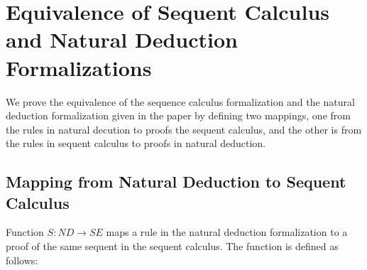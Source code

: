 
\section{Equivalence of Sequent Calculus and Natural Deduction Formalizations}
\label{app:seq-nat-equiv}

We prove the equivalence of the sequence calculus formalization and the
natural deduction formalization given in the paper by defining two
mappings, one from the rules in natural decution to proofs the sequent
calculus, and the other is from the rules in sequent calculus to proofs in
natural deduction.



\subsection{Mapping from Natural Deduction to Sequent Calculus}

Function $S:\mathit{ND}\rightarrow\mathit{SE}$ maps a rule in the natural
deduction formalization to a proof of the same sequent in the sequent
calculus. The function is defined as follows:

